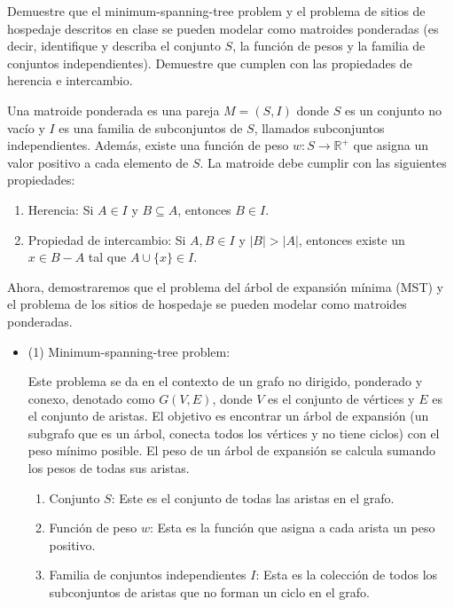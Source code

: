 \begin{problema}
    Demuestre que el minimum-spanning-tree problem y el problema de sitios de hospedaje descritos en clase se pueden modelar como matroides ponderadas (es decir, identifique y describa el conjunto $S$, la función de pesos y la familia de conjuntos independientes). Demuestre que cumplen con las propiedades de herencia e intercambio.
    \begin{dem}
        Una matroide ponderada es una pareja $M = (S, I)$ donde $S$ es un conjunto no vacío y $I$ es una familia de subconjuntos de $S$, llamados subconjuntos independientes. Además, existe una función de peso $w: S \rightarrow \mathbb{R}^+$ que asigna un valor positivo a cada elemento de $S$. La matroide debe cumplir con las siguientes propiedades:
        \begin{enumerate}
            \item Herencia: Si $A \in I$ y $B \subseteq A$, entonces $B \in I$.
            \item Propiedad de intercambio: Si $A, B \in I$ y $|B| > |A|$, entonces existe un $x \in B - A$ tal que $A \cup \{x\} \in I$.
        \end{enumerate}


        Ahora, demostraremos que el problema del árbol de expansión mínima (MST) y el problema de los sitios de hospedaje se pueden modelar como matroides ponderadas.

        \begin{itemize}
            \item (1) Minimum-spanning-tree problem:
            \begin{cajita}
                Este problema se da en el contexto de un grafo no dirigido, ponderado y conexo, denotado como $G(V,E)$, donde $V$ es el conjunto de vértices y $E$ es el conjunto de aristas. El objetivo es encontrar un árbol de expansión (un subgrafo que es un árbol, conecta todos los vértices y no tiene ciclos) con el peso mínimo posible. El peso de un árbol de expansión se calcula sumando los pesos de todas sus aristas. 
            \end{cajita}
            \begin{enumerate}
                \item Conjunto $S$: Este es el conjunto de todas las aristas en el grafo.
                \item Función de peso $w$: Esta es la función que asigna a cada arista un peso positivo.
                \item Familia de conjuntos independientes $I$: Esta es la colección de todos los subconjuntos de aristas que no forman un ciclo en el grafo.
                

\end{enumerate}
\end{itemize}
\end{dem}
\end{problema}
